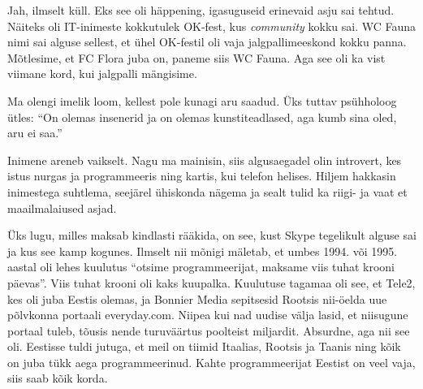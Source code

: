 
Jah, ilmselt küll. Eks see oli häppening, igasuguseid erinevaid asju sai tehtud. Näiteks oli 
IT-inimeste kokkutulek 
OK-fest, 
kus \emph{community} kokku sai. WC Fauna nimi sai alguse sellest, et ühel 
OK-festil oli vaja jalgpallimeeskond kokku panna. Mõtlesime, et FC Flora juba 
on, paneme siis WC Fauna. Aga see oli ka vist viimane kord, kui jalgpalli 
mängisime. 


Ma olengi imelik loom, kellest pole kunagi aru saadud. Üks tuttav 
psühholoog ütles: \enquote{On olemas insenerid ja on olemas kunstiteadlased, 
aga kumb sina oled, aru ei saa.} 

Inimene areneb vaikselt. Nagu ma mainisin, siis algusaegadel olin 
introvert, kes istus nurgas ja programmeeris ning kartis, kui telefon 
helises. Hiljem hakkasin inimestega suhtlema, seejärel ühiskonda nägema ja sealt tulid ka riigi- ja 
vaat et maailmalaiused asjad. 

\label{sisu:everyday}Üks lugu, milles maksab kindlasti rääkida, on see, kust Skype tegelikult alguse sai ja kus see kamp 
kogunes. Ilmselt nii mõnigi mäletab, et umbes 1994. või 
1995. aastal oli lehes kuulutus \enquote{otsime programmeerijat, maksame 
viis tuhat krooni päevas}. Viis tuhat krooni oli kaks kuupalka. 
Kuulutuse tagamaa oli see, et Tele2, kes oli juba Eestis olemas, ja 
Bonnier Media sepitsesid Rootsis 
nii-öelda uue põlvkonna portaali
everyday.com. Niipea kui nad uudise välja lasid, et 
niisugune portaal tuleb, tõusis nende turuväärtus poolteist miljardit. 
Absurdne, aga nii see oli. Eestisse tuldi jutuga, et meil on tiimid Itaalias, Rootsis ja Taanis ning kõik on juba tükk aega programmeerinud. Kahte 
programmeerijat Eestist on veel vaja, siis saab kõik korda. 

